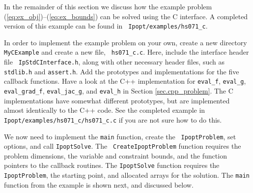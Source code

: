 \documentclass[10pt]{article}
\newcommand{\Ipopt}{{\sc Ipopt }}
\begin{document}
In the remainder of this section we discuss how the example problem
(\ref{eq:ex_obj})--(\ref{eq:ex_bounds}) can be solved using the C
interface.  A completed version of this example can be found in {\tt
  Ipopt/examples/hs071\_c}.


\vspace{\baselineskip}

In order to implement the example problem on your own, create a new
directory {\tt MyCExample} and create a new file, {\tt
  hs071\_c.c}.  Here, include the interface header file {\tt
  IpStdCInterface.h}, along with other necessary header files, such as
{\tt stdlib.h} and {\tt assert.h}.  Add the prototypes and
implementations for the five callback functions.  Have a look at the
C++ implementation for {\tt eval\_f}, {\tt eval\_g}, {\tt
  eval\_grad\_f}, {\tt eval\_jac\_g}, and {\tt eval\_h} in Section
\ref{sec.cpp_problem}. The C implementations have somewhat different
prototypes, but are implemented almost identically to the C++ code.
See the completed example in {\tt Ipopt/examples/hs071\_c/hs071\_c.c} if you
are not sure how to do this.

We now need to implement the {\tt main} function, create the {\tt
  IpoptProblem}, set options, and call {\tt IpoptSolve}. The {\tt
  CreateIpoptProblem} function requires the problem dimensions, the
variable and constraint bounds, and the function pointers to the
callback routines. The {\tt IpoptSolve} function requires the {\tt
  IpoptProblem}, the starting point, and allocated arrays for the
solution.  The {\tt main} function from the example is shown next, and
discussed below.
\end{document}
